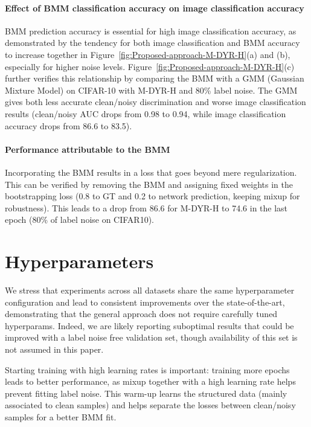 \documentclass{article}
\begin{document}
\paragraph{Effect of BMM classification accuracy on image classification accuracy}
BMM prediction accuracy is essential for high image classification accuracy, as demonstrated by the tendency for both image classification and BMM accuracy to increase together in Figure~\ref{fig:Proposed-approach-M-DYR-H}(a) and (b), especially for higher noise levels. 
Figure~\ref{fig:Proposed-approach-M-DYR-H}(c) further verifies this relationship by comparing the BMM with a GMM (Gaussian Mixture Model) on CIFAR-10 with M-DYR-H and 80\% label noise. 
The GMM gives both less accurate clean/noisy discrimination and worse image classification results (clean/noisy AUC drops from 0.98 to 0.94, while image classification accuracy drops from 86.6 to 83.5).






\paragraph{Performance attributable to the BMM}
Incorporating the BMM results in a loss that goes beyond mere regularization. This can be verified by removing the BMM
and assigning fixed weights in the bootstrapping loss (0.8 to GT and
0.2 to network prediction, keeping mixup for robustness). This leads
to a drop from 86.6 for M-DYR-H to 74.6 in the last epoch (80\% of
label noise on CIFAR10).



\section{Hyperparameters}


We stress that experiments across all datasets share the same hyperparameter
configuration and lead to consistent improvements over the state-of-the-art,
demonstrating that the general approach does not require carefully
tuned hyperparams. Indeed, we are likely reporting suboptimal results
that could be improved with a label noise free validation set, though
availability of this set is not assumed in this paper.

Starting training with high learning rates is important:
training more epochs leads to better performance, as mixup together
with a high learning rate helps prevent fitting label noise. This warm-up
learns the structured data (mainly associated to clean samples) and
helps separate the losses between clean/noisy samples for a better
BMM fit.
\end{document}
